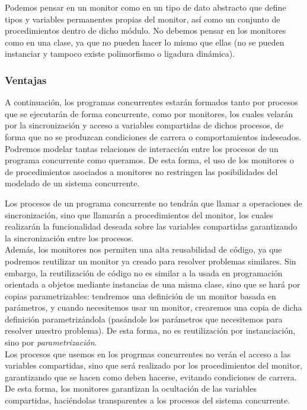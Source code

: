 Podemos pensar en un monitor como en un tipo de dato abstracto que define tipos y variables permanentes propias del monitor, así como un conjunto de procedimientos dentro de dicho módulo. No debemos pensar en los monitores como en una clase, ya que no pueden hacer lo mismo que ellas (no se pueden instanciar y tampoco existe polimorfismo o ligadura dinámica).

\subsubsection{Ventajas}
A continuación, los programas concurrentes estarán formados tanto por procesos que se ejecutarán de forma concurrente, como por monitores, los cuales velarán por la sincronización y acceso a variables compartidas de dichos procesos, de forma que no se produzcan condiciones de carrera o comportamientos indeseados. Podremos modelar tantas relaciones de interacción entre los procesos de un programa concurrente como queramos. De esta forma, el uso de los monitores o de procedimientos asociados a monitores no restringen las posibilidades del modelado de un sistema concurrente. 

Los procesos de un programa concurrente no tendrán que llamar a operaciones de sincronización, sino que llamarán a procedimientos del monitor, los cuales realizarán la funcionalidad deseada sobre las variables compartidas garantizando la sincronización entre los procesos.\\

Además, los monitores nos permiten una alta reusabilidad de código, ya que podremos reutilizar un monitor ya creado para resolver problemas similares. Sin embargo, la reutilización de código no es similar a la usada en programación orientada a objetos mediante instancias de una misma clase, sino que se hará por copias parametrizables: tendremos una definición de un monitor basada en parámetros, y cuando necesitemos usar un monitor, crearemos una copia de dicha definición parametrizándola (pasándole los parámetros que necesitemos para resolver nuestro problema). De esta forma, no es reutilización por instanciación, sino por \textit{parametrización}.\\

Los procesos que usemos en los progrmas concurrentes no verán el acceso a las variables compartidas, sino que será realizado por los procedimientos del monitor, garantizando que se hacen como deben hacerse, evitando condiciones de carrera. De esta forma, los monitores garantizan la ocultación de las variables compartidas, haciéndolas transparentes a los procesos del sistema concurrente.\\

